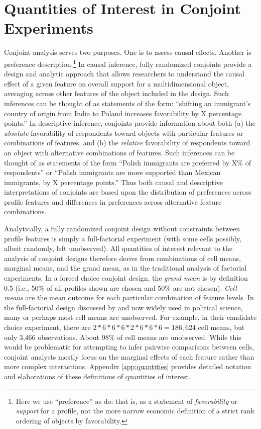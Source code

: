 \documentclass[a4paper,12pt]{article}\usepackage[]{graphicx}\usepackage[]{color}
\begin{document}
\section*{Quantities of Interest in Conjoint Experiments}\label{sec:quantities}

Conjoint analysis serves two purposes. One is to assess causal effects. Another is preference description.\footnote{Here we use ``preference'' as \citet{HainmuellerHopkinsYamamoto2014} do: that is, as a statement of \textit{favorability} or \textit{support} for a profile, not the more narrow economic definition of a strict rank ordering of objects by favorability.} In causal inference, fully randomized conjoints provide a design and analytic approach that allows researchers to understand the causal effect of a given feature on overall support for a multidimensional object, averaging across other features of the object included in the design. Such inferences can be thought of as statements of the form: ``shifting an immigrant's country of origin from India to Poland increases favorability by X percentage points.'' In descriptive inference, conjoints provide information about both (a) the \textit{absolute} favorability of respondents toward objects with particular features or combinations of features, and (b) the \textit{relative} favorability of respondents toward an object with alternative combinations of features. Such inferences can be thought of as statements of the form ``Polish immigrants are preferred by X\% of respondents'' or ``Polish immigrants are more supported than Mexican immigrants, by X percentage points.'' Thus both causal and descriptive interpretations of conjoints are based upon the distribution of preferences across profile features and differences in preferences across alternative feature combinations.

Analytically, a fully randomized conjoint design without constraints between profile features is simply a full-factorial experiment (with some cells possibly, albeit randomly, left unobserved). All quantities of interest relevant to the analysis of conjoint designs therefore derive from combinations of cell means, marginal means, and the grand mean, as in the traditional analysis of factorial experiments. In a forced choice conjoint design, the \textit{grand mean} is by definition 0.5 (i.e., 50\% of all profiles shown are chosen and 50\% are not chosen). \textit{Cell means} are the mean outcome for each particular combination of feature levels. In the full-factorial design discussed by \citet{HainmuellerHopkinsYamamoto2014} and now widely used in political science, many or perhaps most cell means are unobserved. For example, in their candidate choice experiment, there are $2*6*6*6*2*6*6*6 = 186,624$ cell means, but only 3,466 observations. About 98\% of cell means are unobserved. While this would be problematic for attempting to infer pairwise comparisons between cells, conjoint analysts mostly focus on the marginal effects of each feature rather than more complex interactions. Appendix \ref{app:quantities} provides detailed notation and elaborations of these definitions of quantities of interest.
\end{document}
